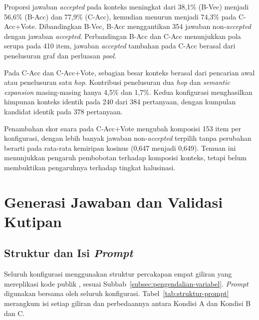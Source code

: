 Proporsi jawaban \emph{accepted} pada konteks meningkat dari 38,1\% (B-Vec) menjadi 56,6\% (B-Acc) dan 77,9\% (C-Acc), kemudian menurun menjadi 74,3\% pada C-Acc+Vote. Dibandingkan B-Vec, B-Acc menggantikan 354 jawaban non-\emph{accepted} dengan jawaban \emph{accepted}. Perbandingan B-Acc dan C-Acc menunjukkan pola serupa pada 410 item, jawaban \emph{accepted} tambahan pada C-Acc berasal dari penelusuran graf dan perluasan \emph{pool}.

Pada C-Acc dan C-Acc+Vote, sebagian besar konteks berasal dari pencarian awal atau penelusuran satu \emph{hop}. Kontribusi penelusuran dua \emph{hop} dan \emph{semantic expansion} masing-masing hanya 4,5\% dan 1,7\%. Kedua konfigurasi menghasilkan himpunan konteks identik pada 240 dari 384 pertanyaan, dengan kumpulan kandidat identik pada 378 pertanyaan.

Penambahan skor suara pada C-Acc+Vote mengubah komposisi 153 item per konfigurasi, dengan lebih banyak jawaban non-\emph{accepted} terpilih tanpa perubahan berarti pada rata-rata kemiripan kosinus (0,647 menjadi 0,649). Temuan ini menunjukkan pengaruh pembobotan terhadap komposisi konteks, tetapi belum membuktikan pengaruhnya terhadap tingkat halusinasi.

\section{Generasi Jawaban dan Validasi Kutipan}
\label{sec:implementasi-generasi}

\subsection{Struktur dan Isi \emph{Prompt}}
\label{subsec:struktur-prompt}

Seluruh konfigurasi menggunakan struktur percakapan empat giliran yang mereplikasi kode publik \textcite{DaSilva2025}, sesuai Subbab~\ref{subsec:pengendalian-variabel}. \emph{Prompt} digunakan bersama oleh seluruh konfigurasi. Tabel~\ref{tab:struktur-prompt} merangkum isi setiap giliran dan perbedaannya antara Kondisi A dan Kondisi B dan C.

